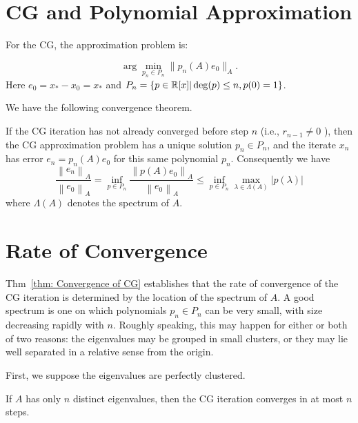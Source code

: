\section{CG and Polynomial Approximation} 
For the CG, the approximation problem is: 


\begin{example}
\label{eg: CG Approximation problem}
\[
    \arg \min_{p_n \in P_n} \|p_n(A) e_0\|_A. 
\]
Here $ e_0 = x_* -x_0 = x_* $ and $ P_n = \{p\in \mathbb{R}[x]| \deg(p)\le n , p(0) =1\}  $. 
\end{example}

We have the following convergence theorem. 

\begin{theorem}
\label{thm: Convergence of CG}
If the CG iteration has not already converged before step $n$ (i.e., $r_{n-1} \neq 0$ ), then the CG approximation problem has a unique solution $p_n \in P_n$, and the iterate $x_n$ has error $e_n=p_n(A) e_0$ for this same polynomial $p_n$. Consequently we have
$$
\frac{\left\|e_n\right\|_A}{\left\|e_0\right\|_A}=\inf _{p \in P_n} \frac{\left\|p(A) e_0\right\|_A}{\left\|e_0\right\|_A} \leq \inf _{p \in P_n} \max _{\lambda \in \Lambda(A)}|p(\lambda)|
$$
where $\Lambda(A)$ denotes the spectrum of $A$.
\end{theorem}

\section{Rate of Convergence} 
Thm~\ref{thm: Convergence of CG} establishes that the rate of convergence of the CG iteration is determined by the location of the spectrum of $ A $.  A good spectrum is one on which polynomials $p_n \in P_n$ can be very small, with size decreasing rapidly with $n$. Roughly speaking, this may happen for either or both of two reasons: the eigenvalues may be grouped in small clusters, or they may lie well separated in a relative sense from the origin. 
 
First, we suppose the eigenvalues are perfectly clustered. 

\begin{corollary}
\label{cor: CG distinct eig}
If $ A $ has only $ n $ distinct eigenvalues, then the CG iteration converges in at most $ n $ steps. 
\end{corollary}

